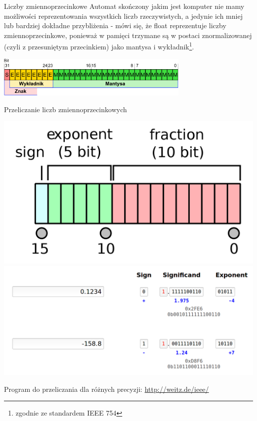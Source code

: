 \begin{frame}{Liczby zmiennoprzecinkowe}
    Automat skończony jakim jest komputer nie mamy możliwości reprezentowania wszystkich liczb
    rzeczywistych, a jedynie ich mniej lub bardziej dokładne przybliżenia - mówi się, że float
    reprezentuje liczby zmiennoprzecinkowe, ponieważ w pamięci trzymane są w postaci znormalizowanej
    (czyli z przesuniętym przecinkiem) jako mantysa i wykładnik\footnote{zgodnie ze standardem IEEE 754}.
    \begin{center}
        \includegraphics[width=0.7\textwidth]{introduction/graphics/ieee_full.png}
    \end{center}
\end{frame}

\begin{frame}{Przeliczanie liczb zmiennoprzecinkowych}
    \begin{center}
        \includegraphics[height=0.2\textheight]{introduction/graphics/ieee_half.png} \\
        \includegraphics[height=0.45\textheight]{introduction/graphics/calculations.png}
    \end{center}
    Program do przeliczania dla różnych precyzji: \url{http://weitz.de/ieee/}
\end{frame}

